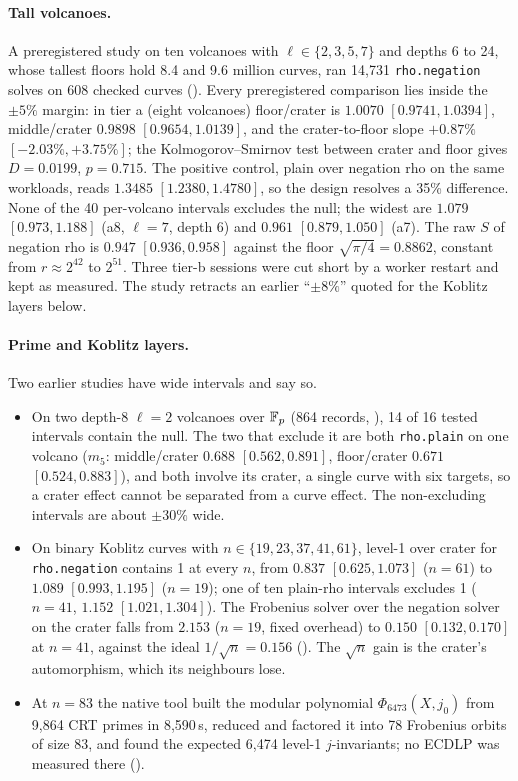 \paragraph{Tall volcanoes.} A preregistered study on ten volcanoes with
$\ell\in\{2,3,5,7\}$ and depths 6 to 24, whose tallest floors hold 8.4 and
9.6 million curves, ran 14{,}731 \texttt{rho.negation} solves on 608
checked curves ().
Every preregistered comparison lies inside the $\pm5\%$ margin: in tier a
(eight volcanoes) floor/crater is $1.0070$ $[0.9741,1.0394]$, middle/crater
$0.9898$ $[0.9654,1.0139]$, and the crater-to-floor slope $+0.87\%$
$[-2.03\%,+3.75\%]$; the Kolmogorov--Smirnov test between crater and floor
gives $D=0.0199$, $p=0.715$. The positive control, plain over negation rho
on the same workloads, reads $1.3485$ $[1.2380,1.4780]$, so the design
resolves a 35\% difference. None of the 40 per-volcano intervals excludes
the null; the widest are $1.079$ $[0.973,1.188]$ (a8, $\ell=7$, depth 6) and
$0.961$ $[0.879,1.050]$ (a7). The raw $S$ of negation rho is $0.947$
$[0.936,0.958]$ against the floor $\sqrt{\pi/4}=0.8862$, constant from
$r\approx2^{42}$ to $2^{51}$. Three tier-b sessions were cut short by a
worker restart and kept as measured. The study retracts an earlier
``$\pm8\%$'' quoted for the Koblitz layers below.

\paragraph{Prime and Koblitz layers.} Two earlier studies have wide
intervals and say so.
\begin{itemize}
\item On two depth-8 $\ell=2$ volcanoes over $\mathbb{F}_p$ (864 records,
  ), 14 of 16 tested
  intervals contain the null. The two that exclude it are both
  \texttt{rho.plain} on one volcano ($m_5$: middle/crater $0.688$
  $[0.562,0.891]$, floor/crater $0.671$ $[0.524,0.883]$), and both involve
  its crater, a single curve with six targets, so a crater effect cannot be
  separated from a curve effect. The non-excluding intervals are about
  $\pm30\%$ wide.
\item On binary Koblitz curves with $n\in\{19,23,37,41,61\}$, level-1 over
  crater for \texttt{rho.negation} contains 1 at every $n$, from $0.837$
  $[0.625,1.073]$ ($n=61$) to $1.089$ $[0.993,1.195]$ ($n=19$); one of ten
  plain-rho intervals excludes 1 ($n=41$, $1.152$ $[1.021,1.304]$). The
  Frobenius solver over the negation solver on the crater falls from
  $2.153$ ($n=19$, fixed overhead) to $0.150$ $[0.132,0.170]$ at $n=41$,
  against the ideal $1/\sqrt n=0.156$
  (). The
  $\sqrt n$ gain is the crater's automorphism, which its neighbours lose.
\item At $n=83$ the native tool built the modular polynomial
  $\Phi_{6473}(X,j_0)$ from 9{,}864 CRT primes in 8{,}590\,s, reduced and
  factored it into 78 Frobenius orbits of size 83, and found the expected
  6{,}474 level-1 $j$-invariants; no ECDLP was measured there
  ().
\end{itemize}

